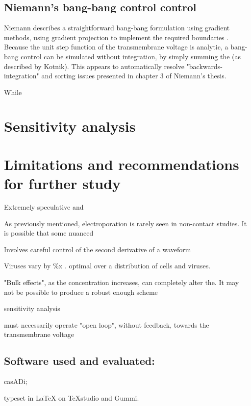 \documentclass[fleqn,10pt]{paper}
\begin{document}
\subsection*{Niemann's bang-bang control control}

Niemann describes a straightforward bang-bang formulation using gradient methods, using gradient projection to implement the required boundaries \cite{Determinationa}. Because the unit step function of the transmembrane voltage is analytic, a bang-bang control can be simulated without integration, by simply summing the (as described by Kotnik). This appears to automatically resolve "backwards-integration" and sorting issues presented in chapter 3 of Niemann's thesis.

While 




\section*{Sensitivity analysis}

\section*{Limitations and recommendations for further study}



Extremely speculative and 

As previously mentioned, electroporation is rarely seen in non-contact studies. It is possible that some nuanced 

Involves careful control of the second derivative of a waveform 

Viruses vary by \%x . optimal over a distribution of cells and viruses. 

"Bulk effects", as the concentration increases, can completely alter the. It may not be possible to produce a robust enough scheme 

sensitivity analysis


must necessarily operate "open loop", without feedback, towards the transmembrane voltage



\subsection*{Software used and evaluated:}

casADi;

typeset in LaTeX on TeXstudio and Gummi.
\end{document}

